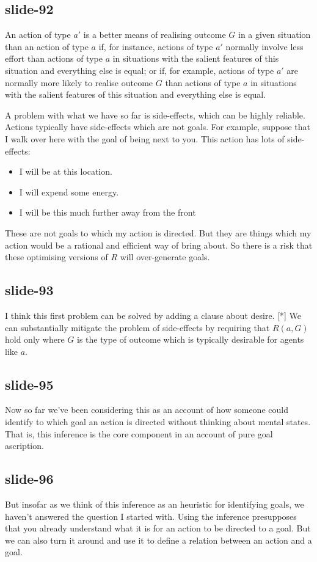 \documentclass[12pt,\papersize]{extarticle}
\begin{document}
 
\subsection{slide-92}
An action of type $a'$ is a better means of realising outcome $G$ in a given situation than an action of type $a$ if, for instance, actions of type $a'$ normally involve less effort than actions of type $a$
in situations with the salient features of this situation
and everything else is equal;
or if, for example, actions of type $a'$ are normally more likely to realise outcome $G$ than actions of type $a$
in situations with the salient features of this situation
and everything else is equal.
 
A problem with what we have so far is side-effects, which can be highly reliable.
Actions typically have side-effects which are not goals. For example,
suppose that I walk over here with the goal of being next to you.
This action has lots of side-effects:
\begin{itemize}
\item I will be at this location.
\item	I will expend some energy.
\item	I will be this much further away from the front
\end{itemize}
These are not goals to which my action is directed.
But they are things which my action would be a rational and efficient way of bring about.
So there is a risk that these optimising versions of $R$ will over-generate goals.
 
 
\subsection{slide-93}
I think this first problem can be solved by adding a clause about desire.
[*] We can substantially mitigate the problem of side-effects by requiring that $R(a,G)$ hold only where $G$ is the type of outcome which is typically desirable for agents like $a$.
 
 
\subsection{slide-95}
Now so far we've been considering this as an account of how someone could identify to which goal an action is directed without thinking about mental states.
That is, this inference is the core component in an account of pure goal ascription.
 
 
\subsection{slide-96}
But insofar as we think of this inference as an heuristic for identifying goals, we haven't answered the question I started with.
Using the inference presupposes that you already understand what it is for an action to be directed to a goal.
But we can also turn it around and use it to define a relation between an action and a goal.
 
\end{document}
